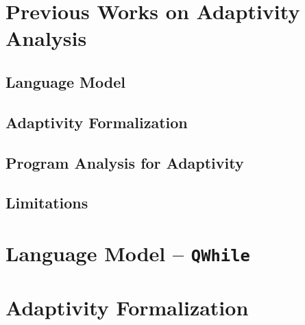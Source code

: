 \documentclass[12pt, letterpaper]{report}   %
\newcommand{\THESYSTEM}{\textsf{AdaptFun}}
\begin{document}
\chapter{Previous Works on Adaptivity Analysis}
\label{sec:prework}

%
\section{Language Model}
\label{sec:prework-language}

%
\section{Adaptivity Formalization}
\label{sec:prework-formalization}

%
\section{Program Analysis for Adaptivity}
\label{sec:prework-static}


\section{Limitations}
\label{sec:prework-limitations}



\label{sec:adapt-analysis}
% 

\clearpage
\chapter{Language Model -- {\tt QWhile}}
\label{sec:adapt-language}


\clearpage
\chapter{Adaptivity Formalization}
\label{sec:adapt-exe}

\end{document}
